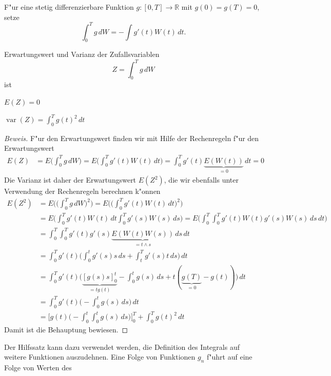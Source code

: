 \begin{definition}
F"ur eine stetig differenzierbare Funktion $g\colon[0,T]\to \mathbb R$ 
mit $g(0)=g(T)=0$, setze
\[
\int_0^T g\,dW = -\int g'(t) W(t)\,dt.
\]
\end{definition}

\begin{hilfssatz}
Erwartungswert und Varianz der Zufallsvariablen
\[
Z=\int_0^T g\,dW
\]
ist
\begin{compactenum}
\item $E(Z)=0$
\item $\operatorname{var}(Z)=\int_0^Tg(t)^2\,dt$
\end{compactenum}
\end{hilfssatz}

\begin{proof}[Beweis]
F"ur den Erwartungswert finden wir mit Hilfe der Rechenregeln f"ur den
Erwartungswert
\begin{align*}
E(Z)
&=
E\biggl(\int_0^T g\,dW\biggr)
=
E\biggl(
\int_0^T g'(t) W(t)\,dt
\biggr)
=
\int_0^T g'(t) \underbrace{E(W(t))}_{\textstyle =0}\,dt=0
\end{align*}
Die Varianz ist daher der Erwartungswert $E(Z^2)$, die wir ebenfalls unter
Verwendung der Rechenregeln berechnen k"onnen
\begin{align*}
E(Z^2)
&=
E\biggl(\biggl(\int_0^T g\,dW\biggr)^2\biggr)
=
E\biggl(
\biggl(
\int_0^T g'(t)W(t)\,dt
\biggr)^2
\biggr)
\\
&=
E\biggl(
\int_0^T g'(t)W(t)\,dt
\int_0^T g'(s)W(s)\,ds
\biggr)
=
E\biggl(
\int_0^T \int_0^T g'(t)W(t) g'(s)W(s) \,ds \,dt
\biggr)
\\
&=
\int_0^T\int_0^Tg'(t)g'(s) \underbrace{E(W(t)W(s))}_{\textstyle =t\wedge s}\,ds\,dt
\\
&=
\int_0^Tg'(t) \biggl(\int_0^t g'(s) s\,ds + \int_t^T g'(s)t\,ds\biggr)
\,dt
\\
&=
\int_0^T g'(t)\biggl(
\underbrace{[g(s)s]_0^t}_{\textstyle =tg(t)}-\int_0^t g(s)\,ds+t(\underbrace{g(T)}_{\textstyle =0}-g(t))
\biggr)\,dt
\\
&=
\int_0^T g'(t)\biggl(-\int_0^t g(s)\,ds\biggr)\,dt
\\
&=
\biggl[
g(t)\biggl(-\int_0^t\int_0^tg(s)\,ds\biggr)
\biggr]_0^T
+
\int_0^Tg(t)^2\,dt
\end{align*}
Damit ist die Behauptung bewiesen.
\end{proof}
Der Hilfssatz kann dazu verwendet werden, die Definition des Integrals auf
weitere Funktionen auszudehnen.
Eine Folge von Funktionen $g_n$ f"uhrt auf eine Folge von Werten des
